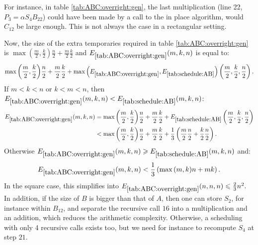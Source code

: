 \documentclass{article}
\renewcommand{\geq}{\geqslant}
\renewcommand{\leq}{\leqslant}
\begin{document}
For instance, in table \ref{tab:ABC:overright:gen}, the last
multiplication (line 22,  $P_3 = \alpha S_4 B_{22}$) could have been
made by a call to the in place algorithm, would $C_{12}$ be large
enough. This is not always the case in a rectangular setting. 

Now, the size of the extra temporaries required in table
\ref{tab:ABC:overright:gen} is
$\max{\left(\frac{m}{2},\frac{k}{2}\right)}\frac{n}{2}+
\frac{m}{2}\frac{k}{2}$ and  $E_{\ref{tab:ABC:overright:gen}}(m,k,n)$
is equal to: 
$$
\max{\left(\frac{m}{2},\frac{k}{2}\right)}\frac{n}{2}  + \frac{m}{2}\frac{k}{2} + \max{\left(E_{\ref{tab:ABC:overright:gen}},E_{\ref{tab:schedule:AB}}\right)}\left(\frac{m}{2},\frac{k}{2},\frac{n}{2}\right).
$$
If $m<k<n$ or $k < m < n$, then $E_{\ref{tab:ABC:overright:gen}}(m,k,n) < E_{\ref{tab:schedule:AB}}(m,k,n)$: 
\begin{align*}
	E_{\ref{tab:ABC:overright:gen}}(m,k,n) &= \max{\left(\frac{m}{2},\frac{k}{2}\right)}\frac{n}{2}  + \frac{m}{2}\frac{k}{2} + E_{\ref{tab:schedule:AB}}\left(\frac{m}{2},\frac{k}{2},\frac{n}{2}\right)\\
	& <  \max{\left(\frac{m}{2},\frac{k}{2}\right)}\frac{n}{2} + \frac{m}{2}\frac{k}{2} + \frac{1}{3}\left(\frac{m}{2}\frac{n}{2}+ \frac{k}{2}\frac{n}{2}\right). 
\end{align*}
Otherwise $E_{\ref{tab:ABC:overright:gen}}(m,k,n) \geq E_{\ref{tab:schedule:AB}}(m,k,n)$ and:
$$
E_{\ref{tab:ABC:overright:gen}}(m,k,n) < \frac{1}{3}\left(\max{\left(m,k\right)}n  + mk \right).
$$
In the square case, this simplifies into
$E_{\ref{tab:ABC:overright:gen}}(n,n,n) \leq \frac{2}{3}n^2.$\\

In addition, if the size of $B$ is bigger than that of $A$, then  one
can store $S_2$, for instance within $B_{12}$, and separate the
recursive call $16$ into a multiplication and an addition, which
reduces the arithmetic complexity. Otherwise, a scheduling with only 4
recursive calls exists too, but we need for instance to recompute
$S_4$ at step $21$.
\end{document}
